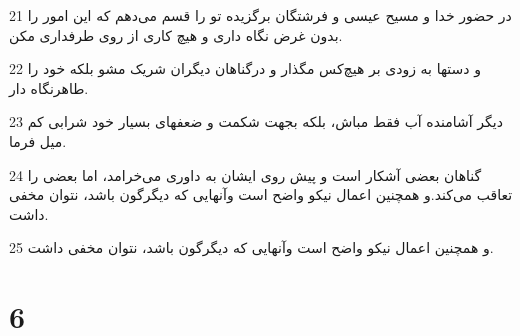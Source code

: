 \par 21 در حضور خدا و مسیح عیسی و فرشتگان برگزیده تو را قسم می‌دهم که این امور را بدون غرض نگاه داری و هیچ کاری از روی طرفداری مکن.
\par 22 و دستها به زودی بر هیچ‌کس مگذار و درگناهان دیگران شریک مشو بلکه خود را طاهرنگاه دار.
\par 23 دیگر آشامنده آب فقط مباش، بلکه بجهت شکمت و ضعفهای بسیار خود شرابی کم میل فرما.
\par 24 گناهان بعضی آشکار است و پیش روی ایشان به داوری می‌خرامد، اما بعضی را تعاقب می‌کند.و همچنین اعمال نیکو واضح است وآنهایی که دیگرگون باشد، نتوان مخفی داشت.
\par 25 و همچنین اعمال نیکو واضح است وآنهایی که دیگرگون باشد، نتوان مخفی داشت.

\chapter{6}

